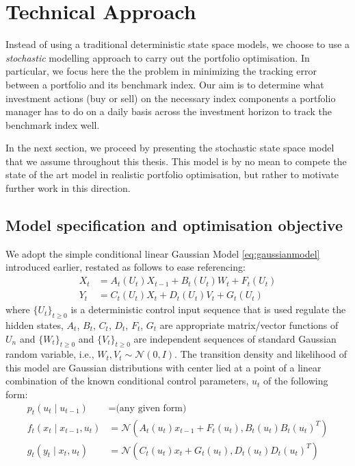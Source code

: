 \section{Technical Approach}
Instead of using a traditional deterministic state space models, we choose to use a \emph{stochastic} modelling approach to carry out the portfolio optimisation. In particular, we focus here the the problem in minimizing the tracking error between a portfolio and its benchmark index.  Our aim is to determine what investment actions (buy or sell) on the necessary index components a portfolio manager has to do on a daily basis across the investment horizon to track the benchmark index well.

In the next section, we proceed by presenting the stochastic state space model that we assume throughout this thesis. This model is by no mean to compete the state of the art model in realistic portfolio optimisation, but rather to motivate further work in this direction.
 
\subsection{Model specification and optimisation objective}
We adopt the simple conditional linear Gaussian Model \eqref{eq:gaussianmodel} introduced earlier, restated as follows to ease referencing:
\begin{align}
  X_t &= A_t(U_t)X_{t-1} + B_t(U_t)W_t + F_t(U_t) \nonumber \\
  Y_t &= C_t(U_t)X_t + D_t(U_t)V_t + G_t(U_t)
\label{eq:model}
\end{align}
where $\{U_t\}_{t \geq 0}$ is a deterministic control input sequence that is used regulate the hidden states, $A_t$, $B_t$, $C_t$, $D_t$, $F_t$, $G_t$ are appropriate matrix/vector functions of $U_n$ and  $\{W_t\}_{t \geq 0}$ and  $\{V_t\}_{t \geq 0}$ are independent sequences of standard Gaussian random variable, i.e., $W_t, V_t \sim \mathcal{N}(0,I)$. The transition density and likelihood of this model are Gaussian distributions with center lied at a point of a linear combination of the known conditional control parameters, $u_t$ of the following form:
\begin{align}
  p_t(u_t \mid u_{t-1}) &= \textrm{(any given form)} \nonumber \\
  f_t(x_t \mid x_{t-1}, u_t) &= \mathcal{N}(A_t(u_t) x_{t-1} + F_t(u_t), B_t(u_t)B_t(u_t)^T) \nonumber \\
  g_t(y_t \mid x_t, u_t)    &= \mathcal{N}(C_t(u_t) x_t + G_t(u_t), D_t(u_t)D_t(u_t)^T)
\end{align}
 
